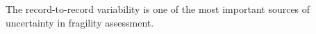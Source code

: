 The record-to-record variability is one of the most important sources of uncertainty in fragility assessment. 